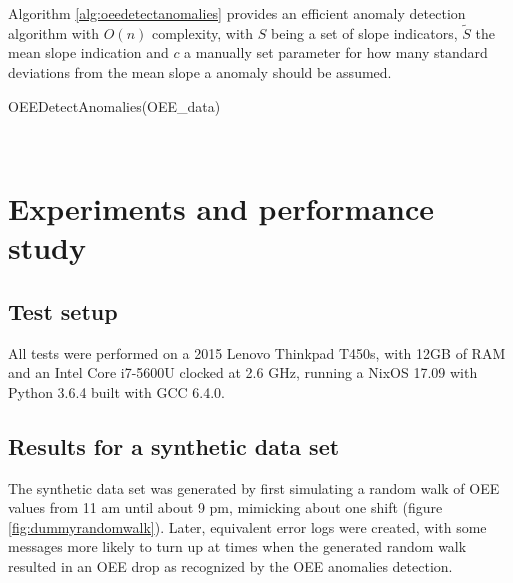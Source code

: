 \documentclass[pdftex,12pt,a4paper]{report}
\begin{document}
Algorithm \ref{alg:oeedetectanomalies} provides an efficient anomaly detection algorithm with $O(n)$ complexity, with $S$ being a set of slope indicators, $\tilde{S}$ the mean slope indication and $c$ a manually set parameter for how many standard deviations from the mean slope a anomaly should be assumed.

\begin{algorithm}
	\caption{OEEDetectAnomalies(OEE\_data)}\label{alg:oeedetectanomalies}
	\begin{algorithmic}[1]
		\Else
		\EndIf
		\EndFor
		\EndFor \\
	\end{algorithmic}
\end{algorithm}
\chapter{Experiments and performance study}
\section{Test setup}
All tests were performed on a 2015 Lenovo Thinkpad T450s, with 12GB of RAM and an Intel Core i7-5600U clocked at 2.6 GHz, running a NixOS 17.09 with Python 3.6.4 built with GCC 6.4.0.
\section{Results for a synthetic data set}
\label{section:synthetic_data_results}
The synthetic data set was generated by first simulating a random walk of OEE values from 11 am until about 9 pm, mimicking about one shift (figure \ref{fig:dummyrandomwalk}). Later, equivalent error logs were created, with some messages more likely to turn up at times when the generated random walk resulted in an OEE drop as recognized by the OEE anomalies detection.
\end{document}
